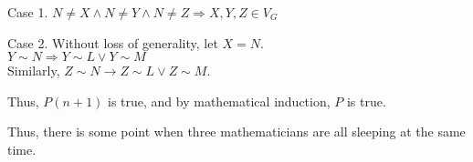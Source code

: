 \documentclass[fleqn]{article}
\begin{document}
Case 1. $N \not= X \wedge N \not= Y \wedge N \not= Z \Rightarrow
        X,Y,Z \in V_G$

Case 2. Without loss of generality, let $X = N$.\\
        $Y \sim N \Rightarrow Y \sim L \vee Y \sim M$\\
        Similarly, $Z \sim N \rightarrow Z \sim L \vee Z \sim M$.

Thus, $P(n+1)$ is true, and by mathematical induction, $P$ is true.

Thus, there is some point when three mathematicians are all sleeping at the same time.
\end{document}
